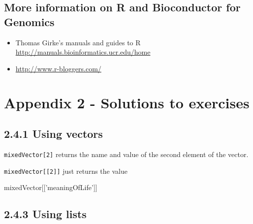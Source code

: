 \documentclass[a4paper]{book}
\newenvironment{Shaded}{}{}
\newcommand{\StringTok}[1]{\textcolor[rgb]{0.00,0.50,0.50}{{#1}}}
\newcommand{\NormalTok}[1]{{#1}}
\providecommand{\tightlist}{%
  \setlength{\itemsep}{0pt}\setlength{\parskip}{0pt}}
\newlength{\leftbarwidth}
\newlength{\leftbarsep}
\newcommand*{\leftbarcolorcmd}{\color{darkgray}}%
\renewenvironment{leftbar}{%
    \def\FrameCommand{{\leftbarcolorcmd{\vrule width \leftbarwidth\relax\hspace {\leftbarsep}}}}%
    \MakeFramed {\advance \hsize -\width \FrameRestore }%
}{%
    \endMakeFramed
}
\renewenvironment{Shaded}
{\vspace{0em}\begin{leftbar}\begin{snugshade}}
{\end{snugshade}\end{leftbar}\vspace{0pt}}
\begin{document}
\section*{More information on R and Bioconductor for
Genomics}\label{more-information-on-r-and-bioconductor-for-genomics}

\begin{itemize}
\tightlist
\item
  Thomas Girke's manuals and guides to R
  \url{http://manuals.bioinformatics.ucr.edu/home}
\item
  \url{http://www.r-bloggers.com/}
\end{itemize}

\chapter*{Appendix 2 - Solutions to
exercises}\label{appendix-2---solutions-to-exercises}

\section*{2.4.1 Using vectors}\label{using-vectors}

\texttt{mixedVector{[}2{]}} returns the name and value of the second
element of the vector.

\texttt{mixedVector{[}{[}2{]}{]}} just returns the value

\begin{Shaded}
\begin{Highlighting}[]
\NormalTok{mixedVector[[}\StringTok{'meaningOfLife'}\NormalTok{]]}
\end{Highlighting}
\end{Shaded}

\section*{2.4.3 Using lists}\label{using-lists}
\end{document}
